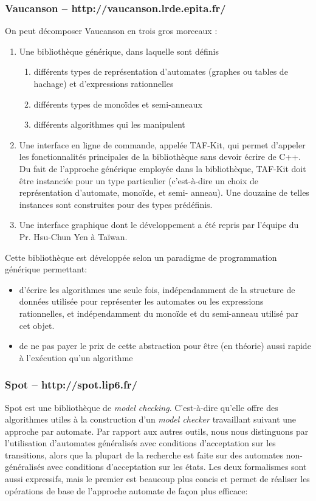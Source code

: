 \documentclass[a4paper,11pt,twoside,final]{article}
\begin{document}
  \subsubsection{Vaucanson – http://vaucanson.lrde.epita.fr/}

  On peut décomposer Vaucanson en trois gros morceaux :
  \begin{enumerate}
    \item Une bibliothèque générique, dans laquelle sont définis
      \begin{enumerate}
        \item différents types de représentation d’automates (graphes ou tables
          de hachage) et d'expressions rationnelles
        \item différents types de monoïdes et semi-anneaux
        \item différents algorithmes qui les manipulent
      \end{enumerate}
    \item Une interface en ligne de commande, appelée TAF-Kit, qui permet
      d’appeler les fonctionnalités principales de la bibliothèque sans devoir
      écrire de C++. Du fait de l'approche générique employée dans la
      bibliothèque, TAF-Kit doit être instanciée pour un type particulier
      (c’est-à-dire un choix de représentation d’automate, monoïde, et semi-
      anneau). Une douzaine de telles instances sont construites pour des types
      prédéfinis.
    \item Une interface graphique dont le développement a été repris par
      l'équipe du Pr. Hsu-Chun Yen à Taïwan.
  \end{enumerate}

  Cette bibliothèque est développée selon un paradigme de programmation
  générique permettant:
  \begin{itemize}
    \item d'écrire les algorithmes une seule fois, indépendamment de la
      structure de données utilisée pour représenter les automates ou les
      expressions rationnelles, et indépendamment du monoïde et du semi-anneau
      utilisé par cet objet.
    \item de ne pas payer le prix de cette abstraction pour être (en théorie)
      aussi rapide à l'exécution qu'un algorithme
  \end{itemize}

  \subsubsection{Spot – http://spot.lip6.fr/}
  Spot est une bibliothèque de \textit{model checking}. C’est-à-dire qu'elle
  offre des algorithmes utiles à la construction d'un \textit{model checker}
  travaillant suivant une approche par automate.  Par rapport aux autres
  outils, nous nous distinguons par l'utilisation d'automates généralisés avec
  conditions d'acceptation sur les transitions, alors que la plupart de la
  recherche est faite sur des automates non-généralisés avec conditions
  d’acceptation sur les états.  Les deux formalismes sont aussi expressifs,
  mais le premier est beaucoup plus concis et permet de réaliser les opérations
  de base de l'approche automate de façon plus efficace:
\end{document}

